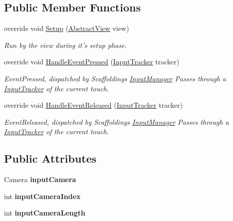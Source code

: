 \subsection*{Public Member Functions}
\begin{DoxyCompactItemize}
\item 
override void \hyperlink{class_scaffolding_1_1_rotate_this_input_a9e0fc73644310f1efd1f49e692638c89}{Setup} (\hyperlink{class_scaffolding_1_1_abstract_view}{Abstract\-View} view)
\begin{DoxyCompactList}\small\item\em Run by the view during it's setup phase. \end{DoxyCompactList}\item 
override void \hyperlink{class_scaffolding_1_1_rotate_this_input_a721eb598cb78a1abb06d8c37f9de01ea}{Handle\-Event\-Pressed} (\hyperlink{class_scaffolding_1_1_input_tracker}{Input\-Tracker} tracker)
\begin{DoxyCompactList}\small\item\em Event\-Pressed, dispatched by Scaffoldings \hyperlink{class_scaffolding_1_1_input_manager}{Input\-Manager} Passes through a \hyperlink{class_scaffolding_1_1_input_tracker}{Input\-Tracker} of the current touch. \end{DoxyCompactList}\item 
override void \hyperlink{class_scaffolding_1_1_rotate_this_input_aa90af18d3d575cb5a5176e3c952e68cd}{Handle\-Event\-Released} (\hyperlink{class_scaffolding_1_1_input_tracker}{Input\-Tracker} tracker)
\begin{DoxyCompactList}\small\item\em Event\-Released, dispatched by Scaffoldings \hyperlink{class_scaffolding_1_1_input_manager}{Input\-Manager} Passes through a \hyperlink{class_scaffolding_1_1_input_tracker}{Input\-Tracker} of the current touch. \end{DoxyCompactList}\end{DoxyCompactItemize}
\subsection*{Public Attributes}
\begin{DoxyCompactItemize}
\item 
\hypertarget{class_scaffolding_1_1_rotate_this_input_a46a0b6462284c544375b785f01bc315c}{Camera {\bfseries input\-Camera}}\label{class_scaffolding_1_1_rotate_this_input_a46a0b6462284c544375b785f01bc315c}

\item 
\hypertarget{class_scaffolding_1_1_rotate_this_input_afb50ecc538a545891be6647d1f615961}{int {\bfseries input\-Camera\-Index}}\label{class_scaffolding_1_1_rotate_this_input_afb50ecc538a545891be6647d1f615961}

\item 
\hypertarget{class_scaffolding_1_1_rotate_this_input_af55328f2f51d26f738238dec61eb308b}{int {\bfseries input\-Camera\-Length}}\label{class_scaffolding_1_1_rotate_this_input_af55328f2f51d26f738238dec61eb308b}

\end{DoxyCompactItemize}


